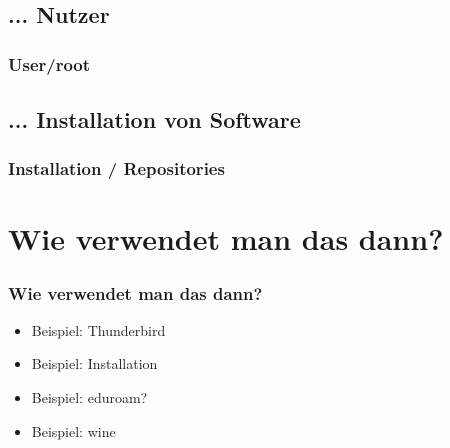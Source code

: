 \documentclass{beamer}
\begin{document}
        \subsection{... Nutzer}
            \begin{frame}
          		\frametitle{User/root}
        		\begin{minipage}{0.44\textwidth}
        		
        		\end{minipage}%
        		\begin{minipage}{0.54\textwidth}
        		
        		\end{minipage}
        	\end{frame}
        	
        \subsection{... Installation von Software}
            \begin{frame}
          		\frametitle{Installation / Repositories}
        		\begin{minipage}{0.44\textwidth}
        		
        		\end{minipage}%
        		\begin{minipage}{0.54\textwidth}
        		
        		\end{minipage}
        	\end{frame}

    \section{Wie verwendet man das dann?}
        \begin{frame}
  		\frametitle{Wie verwendet man das dann?}
    		\begin{center}
        		\begin{minipage}{0.44\textwidth}
        		    \begin{itemize}
        		        \item Beispiel: Thunderbird
        		        \item Beispiel: Installation
        		        \item Beispiel: eduroam?
        		        \item Beispiel: wine
        		    \end{itemize}
        		\end{minipage}%
    		\end{center}
    	\end{frame}
    	
\end{document}
